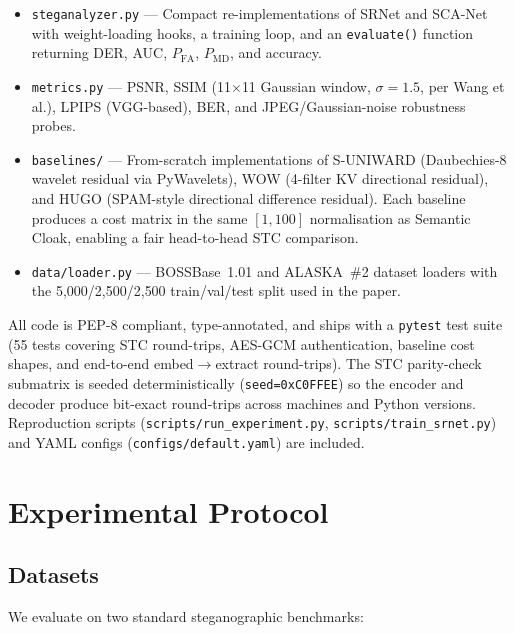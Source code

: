 \documentclass[10pt,a4paper]{article}
\begin{document}
\begin{itemize}[leftmargin=2.2em,itemsep=2pt,topsep=2pt]
    \item \texttt{steganalyzer.py} --- Compact re-implementations of
          SRNet and SCA-Net with weight-loading hooks, a training
          loop, and an \texttt{evaluate()} function returning DER,
          AUC, $P_{\text{FA}}$, $P_{\text{MD}}$, and accuracy.
    \item \texttt{metrics.py} --- PSNR, SSIM (11$\times$11 Gaussian
          window, $\sigma{=}1.5$, per Wang et al.), LPIPS (VGG-based),
          BER, and JPEG/Gaussian-noise robustness probes.
    \item \texttt{baselines/} --- From-scratch implementations of
          S-UNIWARD (Daubechies-8 wavelet residual via PyWavelets),
          WOW (4-filter KV directional residual), and HUGO (SPAM-style
          directional difference residual). Each baseline produces a
          cost matrix in the same $[1, 100]$ normalisation as
          Semantic Cloak, enabling a fair head-to-head STC comparison.
    \item \texttt{data/loader.py} --- BOSSBase~1.01 and ALASKA~\#2
          dataset loaders with the 5{,}000/2{,}500/2{,}500
          train/val/test split used in the paper.
\end{itemize}

All code is PEP-8 compliant, type-annotated, and ships with a
\texttt{pytest} test suite (55 tests covering STC round-trips, AES-GCM
authentication, baseline cost shapes, and end-to-end embed$\to$extract
round-trips). The STC parity-check submatrix is seeded deterministically
(\texttt{seed=0xC0FFEE}) so the encoder and decoder produce bit-exact
round-trips across machines and Python versions. Reproduction scripts
(\texttt{scripts/run\_experiment.py}, \texttt{scripts/train\_srnet.py})
and YAML configs (\texttt{configs/default.yaml}) are included.

\section{Experimental Protocol}
\label{sec:experiments}

\subsection{Datasets}
\label{sec:exp-data}

We evaluate on two standard steganographic benchmarks:
\end{document}
